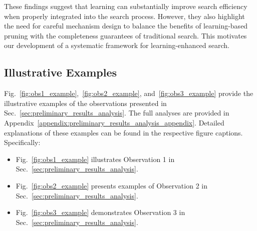 These findings suggest that learning can substantially improve search efficiency when properly integrated into the search process. However, they also highlight the need for careful mechanism design to balance the benefits of learning-based pruning with the completeness guarantees of traditional search. This motivates our development of a systematic framework for learning-enhanced search.

\subsection{Illustrative Examples}
\label{appendix:more_details_pa}
Fig.~\ref{fig:obs1_example},~\ref{fig:obs2_example}, and~\ref{fig:obs3_example} provide the illustrative examples of the observations presented in Sec.~\ref{sec:preliminary_results_analysis}. The full analyses are provided in Appendix~\ref{appendix:preliminary_results_analysis_appendix}. Detailed explanations of these examples can be found in the respective figure captions. Specifically:
\begin{itemize}[leftmargin=*]
    \item Fig.~\ref{fig:obs1_example} illustrates Observation 1 in Sec.~\ref{sec:preliminary_results_analysis}.
    \item Fig.~\ref{fig:obs2_example} presents examples of Observation 2 in Sec.~\ref{sec:preliminary_results_analysis}.
    \item Fig.~\ref{fig:obs3_example} demonstrates Observation 3 in Sec.~\ref{sec:preliminary_results_analysis}.
\end{itemize}


